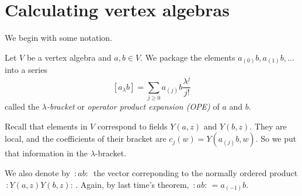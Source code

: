 \section{Calculating vertex algebras}
\label{section-calculating-vertex-algebras}


We begin with some notation.

\begin{definition}
\label{definition-lambda-bracket}
Let $V$ be a vertex algebra and
$a,b \in V$.
We package the elements $a_{(0)}b,a_{(1)}b,\ldots$
into a series
$$
[a_{\lambda}b]=\sum_{j \geq 0}a_{(j)}b \frac{\lambda^j}{j!}
$$
called the {\it $\lambda$-bracket} or {\it operator product expansion (OPE)} 
of $a$ and $b$.
\end{definition}

Recall that elements in $V$ correspond to fields $Y(a,z)$ and $Y(b,z)$.
They are local, and the coefficients of their bracket are
$c_j(w)=Y(a_{(j)}b,w)$. So we put that information in the $\lambda$-bracket.

We also denote by $\,:\!ab\!:\,$ the vector correponding to the normally ordered
product $\,:\!Y(a,z)Y(b,z)\!:\,$. Again, by last time's theorem,
$\,:\!ab\!:\,=a_{(-1)}b$.

